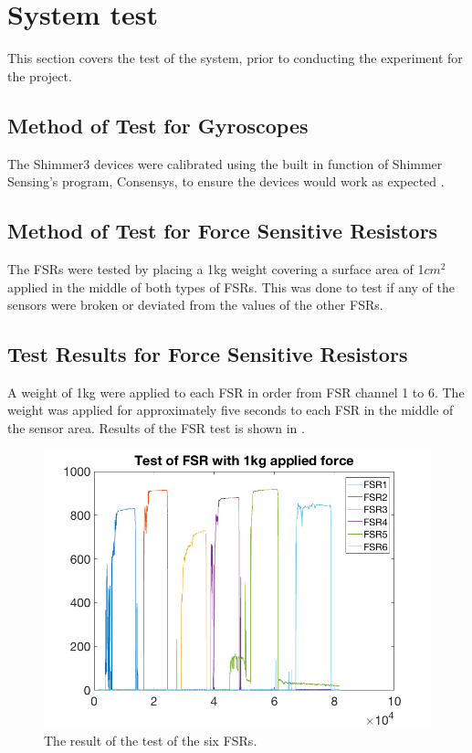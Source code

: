 \section{System test}
This section covers the test of the system, prior to conducting the experiment for the project. 

\subsection{Method of Test for Gyroscopes}
The Shimmer3 devices were calibrated using the built in function of Shimmer Sensing’s program, Consensys, to ensure the devices would work as expected \cite{ShimmerSensing2016}.



\subsection{Method of Test for Force Sensitive Resistors}
The FSRs were tested by placing a 1kg weight covering a surface area of 1$cm^{2}$ applied in the middle of both types of FSRs. This was done to test if any of the sensors were broken or deviated from the values of the other FSRs. %


\subsection{Test  Results for Force Sensitive Resistors}
A weight of 1kg were applied to each FSR in order from FSR channel 1 to 6. The weight was applied for approximately five seconds to each FSR in the middle of the sensor area. Results of the FSR test is shown in .

\begin{figure}[H]
	\includegraphics[width=.7\textwidth]{figures/FSRTestPlot1kg}
	\caption{The result of the test of the six FSRs.}
	\label{fig:FSRTestPlot1kg}  %
\end{figure}

